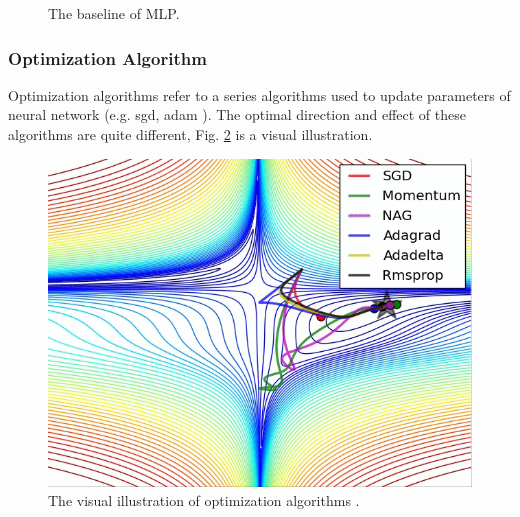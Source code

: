 \documentclass[12pt,a4paper]{article}
\theoremstyle{definition}
\begin{document}
\begin{figure}[H]
	\centering
	\caption{The baseline of MLP.}
	\label{fig:mlp-baseline}
\end{figure}

\subsubsection{Optimization Algorithm}
\label{sec:optim}

Optimization algorithms refer to a series algorithms used to update parameters of neural network (e.g. sgd, adam \cite{adam}). The optimal direction and effect of these algorithms are quite different, Fig. \ref{fig:example} is a visual illustration.

\begin{figure}[H]
	\centering
	\includegraphics[width=0.45\linewidth]{img/optim_example.png}
	\caption{The visual illustration of optimization algorithms \cite{optim_example}.}
	\label{fig:example}
\end{figure}
\end{document}
